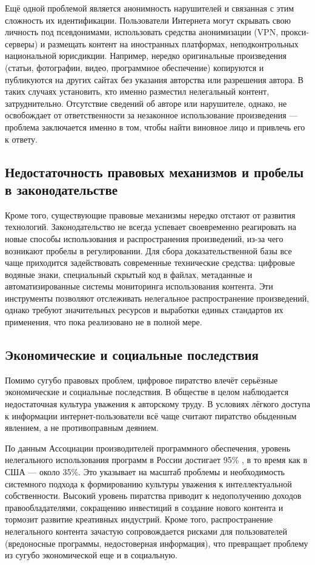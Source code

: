 Ещё одной проблемой является анонимность нарушителей и связанная с этим сложность их
идентификации. Пользователи Интернета могут скрывать свою личность под псевдонимами,
использовать средства анонимизации (VPN, прокси-серверы) и размещать контент на
иностранных платформах, неподконтрольных национальной юрисдикции. Например, нередко
оригинальные произведения (статьи, фотографии, видео, программное обеспечение)
копируются и публикуются на других сайтах без указания авторства или разрешения автора.
В таких случаях установить, кто именно разместил нелегальный контент, затруднительно.
Отсутствие сведений об авторе или нарушителе, однако, не освобождает от ответственности
за незаконное использование произведения — проблема заключается именно в том, чтобы найти
виновное лицо и привлечь его к ответу.

\subsection{Недостаточность правовых механизмов и пробелы в законодательстве}

Кроме того, существующие правовые механизмы нередко отстают от развития технологий.
Законодательство не всегда успевает своевременно реагировать на новые способы
использования и распространения произведений, из-за чего возникают пробелы в
регулировании. Для сбора доказательственной базы все чаще приходится задействовать
современные технические средства: цифровые водяные знаки, специальный скрытый код в
файлах, метаданные и автоматизированные системы мониторинга использования контента. Эти
инструменты позволяют отслеживать нелегальное распространение произведений, однако
требуют значительных ресурсов и выработки единых стандартов их применения, что пока
реализовано не в полной мере.

\subsection{Экономические и социальные последствия}

Помимо сугубо правовых проблем, цифровое пиратство влечёт серьёзные экономические и
социальные последствия. В обществе в целом наблюдается недостаточная культура уважения к
авторскому труду. В условиях лёгкого доступа к информации интернет-пользователи всё чаще
считают пиратство обыденным явлением, а не противоправным деянием.

По данным Ассоциации производителей программного обеспечения, уровень нелегального
использования программ в России достигает 95\% \cite{Gavrilov2014}, в то время как в
США — около 35\%. Это указывает на масштаб проблемы и необходимость системного подхода к
формированию культуры уважения к интеллектуальной собственности. Высокий уровень
пиратства приводит к недополучению доходов правообладателями, сокращению инвестиций в
создание нового контента и тормозит развитие креативных индустрий. Кроме того,
распространение нелегального контента зачастую сопровождается рисками для пользователей
(вредоносные программы, недостоверная информация), что превращает проблему из сугубо
экономической еще и в социальную.
